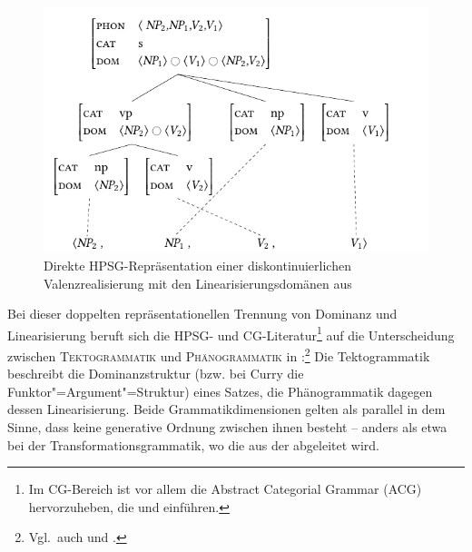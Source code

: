 \begin{figure}[t]
\centering
\includegraphics{graphics/abb64.pdf}
\caption{\label{fig-kohaerenz-strategien-2}Direkte HPSG-Repräsentation einer diskontinuierlichen Valenzrealisierung mit den Linearisierungsdomänen aus \cite{Reape:92,Reape:94,Reape:96}}
\end{figure}
 
Bei dieser doppelten repräsentationellen Trennung von Dominanz und Linearisierung beruft sich die HPSG- und CG-Literatur\footnote{Im CG-Bereich ist vor allem die Abstract Categorial Grammar (ACG) hervorzuheben, die \cite{deGroote:01} und \cite{Muskens:01} einführen.} auf die Unterscheidung zwischen \textsc{Tektogrammatik} und \textsc{Phänogrammatik} in \citet[65f]{Curry:63}:\footnote{Vgl.\ auch \citet[12ff]{Dowty:96} und \citet[35ff]{Kathol:00}.} Die Tektogrammatik beschreibt die Dominanzstruktur (bzw. bei Curry die Funktor"=Argument"=Struktur) eines Satzes, die Phänogrammatik dagegen dessen Linearisierung. Beide Grammatikdimensionen gelten als parallel in dem Sinne, dass keine generative Ordnung zwischen ihnen besteht -- anders als etwa bei der Transformationsgrammatik, wo die  aus der  abgeleitet wird. 


